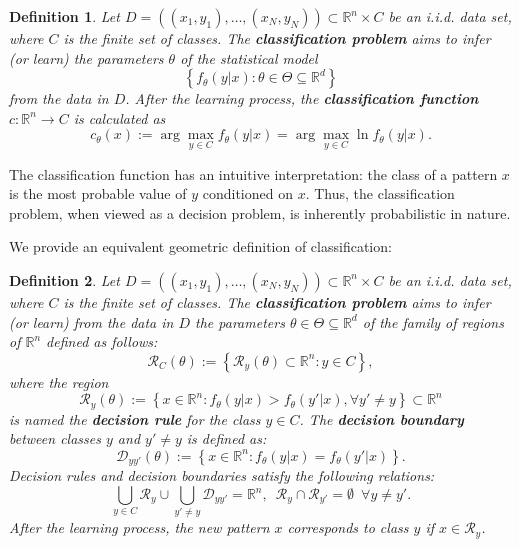 \documentclass{report}
\newtheorem{definition}{Definition}[chapter]
\begin{document}
\begin{definition}
Let $D = ((x_1,y_1),\dots,(x_N,y_N)) \subset \mathbb{R}^n\times C$ be an i.i.d. data set, where $C$ is the finite set of classes. The \textbf{classification problem} aims to infer (or learn) the parameters $\theta$ of the statistical model 
\begin{equation}
\left\{f_\theta(y|x) : \theta \in \Theta \subseteq \mathbb{R}^d\right\}
\end{equation}
from the data in $D$. After the learning process, the \textbf{classification function} $c : \mathbb{R}^n \to C$ is calculated as
\begin{equation}
 c_\theta(x) := \arg\max_{y\in C}f_\theta(y|x) = \arg\max_{y\in C}\ln f_\theta(y|x).
\end{equation}
\end{definition}

The classification function has an intuitive interpretation: the class of a pattern $x$ is the most probable value of $y$ conditioned on $x$. Thus, the classification problem, when viewed as a decision problem, is inherently probabilistic in nature.

We provide an equivalent geometric definition of classification:

\begin{definition}
Let $D = ((x_1,y_1),\dots,(x_N,y_N)) \subset \mathbb{R}^n\times C$ be an i.i.d. data set, where $C$ is the finite set of classes. The \textbf{classification problem} aims to infer (or learn) from the data in $D$ the parameters $\theta \in \Theta \subseteq \mathbb{R}^d$ of the family of regions of $\mathbb{R}^n$ defined as follows: 
\begin{equation}
\mathcal{R}_C(\theta) := \left\{\mathcal{R}_y(\theta) \subset \mathbb{R}^n : y \in C\right\},
\end{equation}
where the region
\begin{equation}
\mathcal{R}_y(\theta) := \left\{x \in \mathbb{R}^n : f_\theta(y|x) > f_\theta(y'|x), \forall y' \neq y\right\} \subset \mathbb{R}^n
\end{equation}
is named the \textbf{decision rule} for the class $y \in C$. The \textbf{decision boundary} between classes $y$ and $y'\neq y$ is defined as:
\begin{equation}
\mathcal{D}_{yy'}(\theta) :=\left\{x \in \mathbb{R}^n : f_\theta(y|x) = f_\theta(y'|x) \right\}.
\end{equation}
Decision rules and decision boundaries satisfy the following relations:
\begin{equation}
\bigcup_{y\in C}\mathcal{R}_y \cup \bigcup_{y'\neq y}\mathcal{D}_{yy'} = \mathbb{R}^n,\,\,\,\mathcal{R}_y\cap\mathcal{R}_{y'} = \emptyset\,\,\,\forall y \neq y'.
\end{equation}
After the learning process, the new pattern $x$ corresponds to class $y$ if $x \in \mathcal{R}_y$.
\end{definition}
\end{document}
